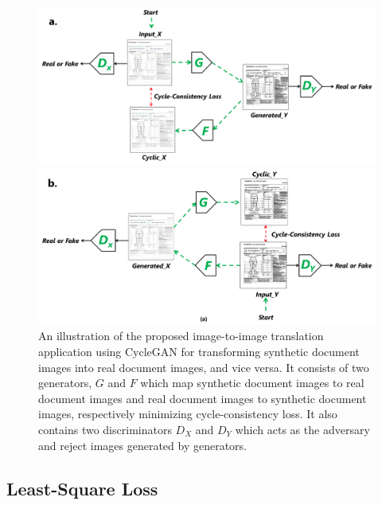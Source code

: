 \begin{figure}[H]
  \centering
  \begin{minipage}[b]{1.1\textwidth}
    \includegraphics[width=\textwidth]{images/Methodology/Gxy.png}
  \end{minipage}
  \vfill
  \begin{minipage}[b]{1.1\textwidth}
    \includegraphics[width=\textwidth]{images/Methodology/Fyx.png}
  \end{minipage}
  \caption[An illustration of the proposed image-to-image translation application using \ac{CycleGAN} for transforming synthetic document images into real document images, and vice versa.]{An illustration of the proposed image-to-image translation application using \ac{CycleGAN} for transforming synthetic document images into real document images, and vice versa. It consists of two generators, $G$ and $F$ which map synthetic document images to real document images and real document images to synthetic document images, respectively minimizing cycle-consistency loss\cite{zhu2020unpaired}. It also contains two discriminators $D_X$ and $D_Y$ which acts as the adversary and reject images generated by generators.}
  \label{fig:GxyFyx}
\end{figure}

\subsection{Least-Square Loss}


